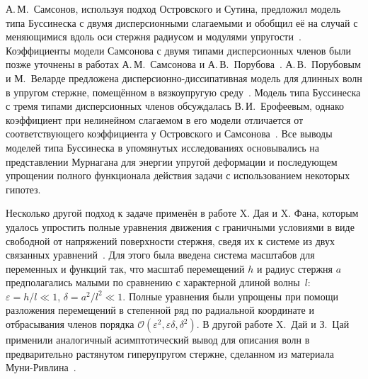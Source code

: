 \documentclass[12pt, a4paper]{report}
\begin{document}
А.\,М.~Самсонов, используя подход Островского и Сутина, предложил модель типа Буссинеска с двумя дисперсионными слагаемыми и обобщил её на случай с меняющимися вдоль оси стержня радиусом и модулями упругости~\cite{S1, S2}. Коэффициенты модели Самсонова с двумя типами дисперсионных членов были позже уточнены в работах А.\,М.~Самсонова и А.\,В.~Порубова~\cite{SP}.
А.\,В.~Порубовым и М.~Веларде предложена дисперсионно-диссипативная модель для длинных волн в упругом стержне, помещённом в вязкоупругую среду~\cite{PV}.
Модель типа Буссинеска с тремя типами дисперсионных членов обсуждалась В.\,И.~Ерофеевым, однако коэффициент при нелинейном слагаемом в его модели отличается от соответствующего коэффициента у Островского и Самсонова~\cite{E_book}. Все выводы моделей типа Буссинеска в упомянутых исследованиях основывались на представлении Мурнагана для энергии упругой деформации и последующем упрощении полного функционала действия задачи с использованием некоторых гипотез. 

Несколько другой подход к задаче применён в работе X. Дая и X. Фана, которым удалось упростить полные уравнения движения с граничными условиями в виде свободной от напряжений поверхности стержня, сведя их к системе из двух связанных уравнений~\cite{DF}. Для этого была введена система масштабов для переменных и функций так, что масштаб перемещений $h$ и радиус стержня $a$предполагались малыми по сравнению с характерной длиной волны~$l$: $\varepsilon = h/l \ll 1$, $\delta = a^2/l^2 \ll 1$.
Полные уравнения были упрощены при помощи разложения перемещений в степенной ряд по радиальной координате и отбрасывания членов порядка $\mathcal{O}(\varepsilon^2, \varepsilon\delta, \delta^2)$.
В другой работе X.~Дай и З.~Цай применили аналогичный асимптотический вывод для описания волн в предварительно растянутом гиперупругом стержне, сделанном из материала Муни-Ривлина~\cite{DC}.
\end{document}
